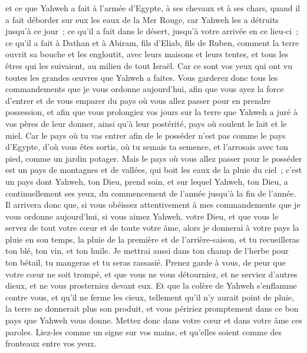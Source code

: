 \begin{multicols}{2}
et ce que Yahweh a fait à l'armée d'Egypte, à ses chevaux et à ses chars, quand il a fait déborder sur eux les eaux de la Mer Rouge, car Yahweh les a détruits jusqu'à ce jour~;
ce qu'il a fait dans le désert, jusqu'à votre arrivée en ce lieu-ci~;
ce qu'il a fait à Dathan et à Abiram, fils d'Eliab, fils de Ruben, comment la terre ouvrit sa bouche et les engloutit, avec leurs maisons et leurs tentes, et tous les êtres qui les suivaient, au milieu de tout Israël.
Car ce sont vos yeux qui ont vu toutes les grandes œuvres que Yahweh a faites.
Vous garderez donc tous les commandements que je vous ordonne aujourd'hui, afin que vous ayez la force d'entrer et de vous emparer du pays où vous allez passer pour en prendre possession,
et afin que vous prolongiez vos jours sur la terre que Yahweh a juré à vos pères de leur donner, ainsi qu'à leur postérité, pays où coulent le lait et le miel.
Car le pays où tu vas entrer afin de le posséder n'est pas comme le pays d'Egypte, d'où vous êtes sortis, où tu semais ta semence, et l'arrosais avec ton pied, comme un jardin potager.
Mais le pays où vous allez passer pour le posséder est un pays de montagnes et de vallées, qui boit les eaux de la pluie du ciel~;
c'est un pays dont Yahweh, ton Dieu, prend soin, et sur lequel Yahweh, ton Dieu, a continuellement ses yeux, du commencement de l'année jusqu'à la fin de l'année.
Il arrivera donc que, si vous obéissez attentivement à mes commandements que je vous ordonne aujourd'hui, si vous aimez Yahweh, votre Dieu, et que vous le servez de tout votre cœur et de toute votre âme,
alors je donnerai à votre pays la pluie en son temps, la pluie de la première et de l'arrière-saison, et tu recueilleras ton blé, ton vin, et ton huile.
Je mettrai aussi dans ton champ de l'herbe pour ton bétail, tu mangeras et tu seras rassasié.
Prenez garde à vous, de peur que votre cœur ne soit trompé, et que vous ne vous détourniez, et ne serviez d'autres dieux, et ne vous prosterniez devant eux.
Et que la colère de Yahweh s'enflamme contre vous, et qu'il ne ferme les cieux, tellement qu'il n'y aurait point de pluie, la terre ne donnerait plus son produit, et vous péririez promptement dans ce bon pays que Yahweh vous donne.
Mettez donc dans votre cœur et dans votre âme ces paroles. Liez-les comme un signe sur vos mains, et qu'elles soient comme des fronteaux entre vos yeux.

\end{multicols}
